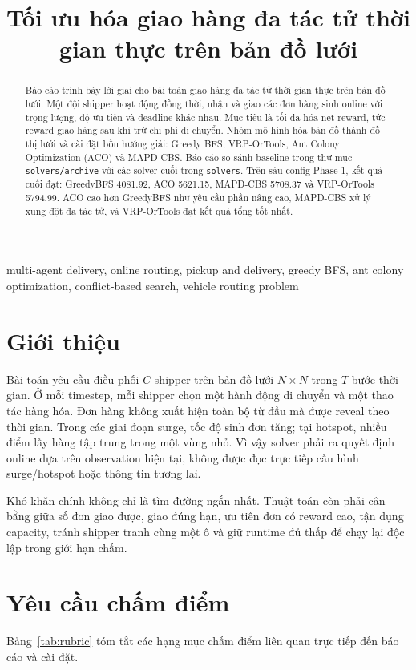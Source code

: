 \documentclass[conference]{IEEEtran}
\title{Tối ưu hóa giao hàng đa tác tử thời gian thực trên bản đồ lưới}
\author{
\IEEEauthorblockN{Tên thành viên 1, Tên thành viên 2, Tên thành viên 3}
\IEEEauthorblockA{
Nhóm: \textit{Điền thông tin nhóm}\\
Email: \textit{Điền email nhóm}
}
}
\newcommand{\code}[1]{\texttt{#1}}
\begin{document}
\maketitle

\begin{abstract}
Báo cáo trình bày lời giải cho bài toán giao hàng đa tác tử thời gian thực trên bản đồ lưới. Một đội shipper hoạt động đồng thời, nhận và giao các đơn hàng sinh online với trọng lượng, độ ưu tiên và deadline khác nhau. Mục tiêu là tối đa hóa net reward, tức reward giao hàng sau khi trừ chi phí di chuyển. Nhóm mô hình hóa bản đồ thành đồ thị lưới và cài đặt bốn hướng giải: Greedy BFS, VRP-OrTools, Ant Colony Optimization (ACO) và MAPD-CBS. Báo cáo so sánh baseline trong thư mục \code{solvers/archive} với các solver cuối trong \code{solvers}. Trên sáu config Phase 1, kết quả cuối đạt: GreedyBFS 4081.92, ACO 5621.15, MAPD-CBS 5708.37 và VRP-OrTools 5794.99. ACO cao hơn GreedyBFS như yêu cầu phần nâng cao, MAPD-CBS xử lý xung đột đa tác tử, và VRP-OrTools đạt kết quả tổng tốt nhất.
\end{abstract}

\begin{IEEEkeywords}
multi-agent delivery, online routing, pickup and delivery, greedy BFS, ant colony optimization, conflict-based search, vehicle routing problem
\end{IEEEkeywords}

\section{Giới thiệu}
Bài toán yêu cầu điều phối $C$ shipper trên bản đồ lưới $N \times N$ trong $T$ bước thời gian. Ở mỗi timestep, mỗi shipper chọn một hành động di chuyển và một thao tác hàng hóa. Đơn hàng không xuất hiện toàn bộ từ đầu mà được reveal theo thời gian. Trong các giai đoạn surge, tốc độ sinh đơn tăng; tại hotspot, nhiều điểm lấy hàng tập trung trong một vùng nhỏ. Vì vậy solver phải ra quyết định online dựa trên observation hiện tại, không được đọc trực tiếp cấu hình surge/hotspot hoặc thông tin tương lai.

Khó khăn chính không chỉ là tìm đường ngắn nhất. Thuật toán còn phải cân bằng giữa số đơn giao được, giao đúng hạn, ưu tiên đơn có reward cao, tận dụng capacity, tránh shipper tranh cùng một ô và giữ runtime đủ thấp để chạy lại độc lập trong giới hạn chấm.

\section{Yêu cầu chấm điểm}
Bảng~\ref{tab:rubric} tóm tắt các hạng mục chấm điểm liên quan trực tiếp đến báo cáo và cài đặt.
\end{document}
